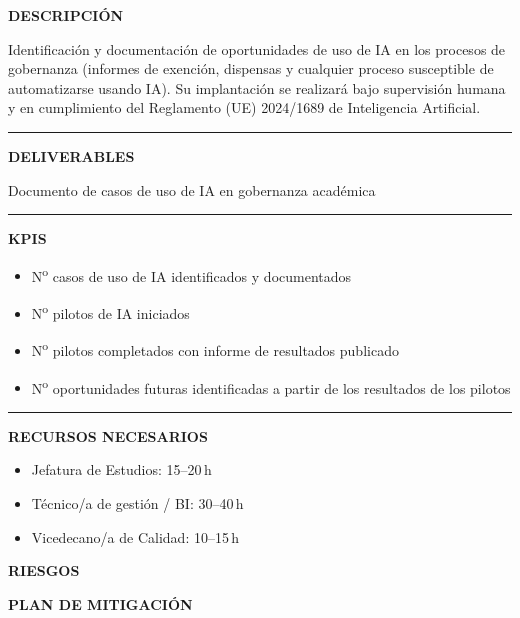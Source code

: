 \documentclass[11pt,a4paper]{scrreprt}
\newcommand{\fieldlabel}[1]{%
  {\footnotesize\sffamily\bfseries\color{mutedcolor}\MakeUppercase{#1}}\par\nopagebreak[4]
}
\newcommand{\fieldsep}{\vspace{3pt}\noindent\textcolor{bordercolor}{\rule{\linewidth}{0.4pt}}\vspace{3pt}\par}
\begin{document}
\begin{tcolorbox}[pabox={gobcolor}{PA4.1 \enspace\textbullet\enspace Identificación y despliegue de aplicaciones de IA en gobernanza académica}]

\fieldlabel{Descripci\'on}
{\small Identificación y documentación de oportunidades de uso de IA en los procesos de gobernanza (informes de exención, dispensas y cualquier proceso susceptible de automatizarse usando IA). Su implantación se realizará bajo supervisión humana y en cumplimiento del Reglamento (UE) 2024/1689 de Inteligencia Artificial.}\par
\fieldsep
\fieldlabel{Deliverables}
{\small Documento de casos de uso de IA en gobernanza académica}\par
\fieldsep
\fieldlabel{KPIs}
{\small \begin{itemize}[noitemsep,topsep=2pt]
\item N\textsuperscript{o} casos de uso de IA identificados y documentados
\item N\textsuperscript{o} pilotos de IA iniciados
\item N\textsuperscript{o} pilotos completados con informe de resultados publicado
\item N\textsuperscript{o} oportunidades futuras identificadas a partir de los resultados de los pilotos
\end{itemize}}\par
\fieldsep
\fieldlabel{Recursos necesarios}
{\small \begin{itemize}[noitemsep,topsep=2pt]
\item Jefatura de Estudios: 15--20\,h
\item Técnico/a de gestión / BI: 30--40\,h
\item Vicedecano/a de Calidad: 10--15\,h
\end{itemize}}\par
\end{tcolorbox}
\begin{tcolorbox}[riskbox]
{\footnotesize\sffamily\bfseries\color{red!50!black} RIESGOS}\par{}
\end{tcolorbox}
\begin{tcolorbox}[mitbox]
{\footnotesize\sffamily\bfseries\color{green!40!black} PLAN DE MITIGACI\'ON}\par{}
\end{tcolorbox}
\vspace{8pt}
\end{document}
